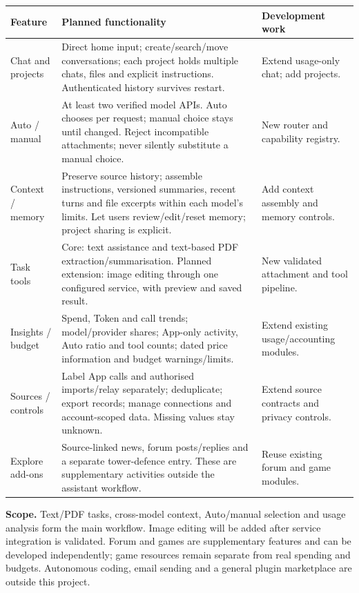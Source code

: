 \documentclass[10pt,a4paper]{article}
\newcommand{\sect}[2]{\par\vspace{6pt}{\sffamily\bfseries\fontsize{12.5}{15}\selectfont\color{ink}#1\enspace #2}\par\vspace{2pt}}
\newcommand{\tablehead}[1]{\rowcolor{pale}\sffamily\bfseries #1}
\begin{document}
\newpage
\sect{4}{Functional requirements and scope}
{\fontsize{9.5}{11.5}\selectfont
\begin{tabularx}{\linewidth}{@{}L{29mm}Y L{29mm}@{}}
\toprule
\tablehead{Feature} & \sffamily\bfseries Planned functionality & \sffamily\bfseries Development work \\
\midrule
Chat and projects & Direct home input; create/search/move conversations; each project holds multiple chats, files and explicit instructions. Authenticated history survives restart. & Extend usage-only chat; add projects. \\
\addlinespace[3pt]
Auto / manual & At least two verified model APIs. Auto chooses per request; manual choice stays until changed. Reject incompatible attachments; never silently substitute a manual choice. & New router and capability registry. \\
\addlinespace[3pt]
Context / memory & Preserve source history; assemble instructions, versioned summaries, recent turns and file excerpts within each model's limits. Let users review/edit/reset memory; project sharing is explicit. & Add context assembly and memory controls. \\
\addlinespace[3pt]
Task tools & Core: text assistance and text-based PDF extraction/summarisation. Planned extension: image editing through one configured service, with preview and saved result. & New validated attachment and tool pipeline. \\
\addlinespace[3pt]
Insights / budget & Spend, Token and call trends; model/provider shares; App-only activity, Auto ratio and tool counts; dated price information and budget warnings/limits. & Extend existing usage/accounting modules. \\
\addlinespace[3pt]
Sources / controls & Label App calls and authorised imports/relay separately; deduplicate; export records; manage connections and account-scoped data. Missing values stay unknown. & Extend source contracts and privacy controls. \\
\addlinespace[3pt]
Explore add-ons & Source-linked news, forum posts/replies and a separate tower-defence entry. These are supplementary activities outside the assistant workflow. & Reuse existing forum and game modules. \\
\bottomrule
\end{tabularx}}

\textbf{Scope.} Text/PDF tasks, cross-model context, Auto/manual selection and usage analysis form the main workflow. Image editing will be added after service integration is validated. Forum and games are supplementary features and can be developed independently; game resources remain separate from real spending and budgets. Autonomous coding, email sending and a general plugin marketplace are outside this project.
\end{document}
